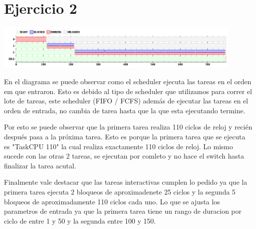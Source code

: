 \section{Ejercicio 2}

\begin {center}
\includegraphics[width=12cm]{../simusched/outputs/outEj2.png}
\end {center}


En el diagrama se puede observar como el scheduler ejecuta las tareas en el orden em que entraron. Esto es debido al tipo de scheduler que utilizamos para correr el lote de tareas, este scheduler (FIFO / FCFS) además de ejecutar las tareas en el orden de entrada, no cambia de tarea hasta que la que esta ejecutando termine. 

Por esto se puede observar que la primera tarea realiza 110 ciclos de reloj y recién después pasa a la próxima tarea. Esto es porque la primera tarea que se ejecuta es "TaskCPU 110" la cual realiza exactamente 110 ciclos de reloj. Lo mismo sucede con las otras 2 tareas, se ejecutan por comleto y no hace el switch hasta finalizar la tarea acutal.

Finalmente vale destacar que las tareas interactivas cumplen lo pedido ya que la primera tarea ejecuta 2 bloqueos de aproximadenete 25 ciclos y la segunda 5 bloqueos de aproximadamente 110 ciclos cada uno. Lo que se ajusta los parametros de entrada ya que la primera tarea tiene un rango de duracion por ciclo de entre 1 y 50 y la segunda entre 100 y 150.
